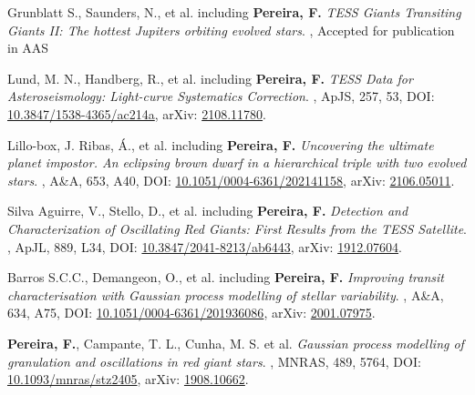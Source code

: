 \documentclass[letterpaper,10pt,oneside]{article}
\begin{document}
\begin{body}
\BulletItem
Grunblatt S., Saunders, N., et al. including \textbf{Pereira, F.} \newline
\textit{TESS Giants Transiting Giants II: The hottest Jupiters orbiting evolved stars}. , Accepted for publication in AAS

\BulletItem
Lund, M. N., Handberg, R., et al. including \textbf{Pereira, F.} \newline
\textit{TESS Data for Asteroseismology: Light-curve Systematics Correction}. , ApJS, 257, 53,
DOI: \href{https://doi.org/10.3847/1538-4365/ac214a}{10.3847/1538-4365/ac214a}, 
arXiv: \href{https://arxiv.org/abs/2108.11780}{2108.11780}.

\BulletItem
Lillo-box, J. Ribas, Á., et al. including \textbf{Pereira, F.} \newline
\textit{Uncovering the ultimate planet impostor. An eclipsing brown dwarf in a hierarchical triple with two evolved stars}. , A\&A, 653, A40,
DOI: \href{https://doi.org/10.1051/0004-6361/202141158}{10.1051/0004-6361/202141158}, 
arXiv: \href{https://arxiv.org/abs/2106.05011}{2106.05011}.

\BulletItem
Silva Aguirre, V., Stello, D., et al. including \textbf{Pereira, F.} \newline
\textit{Detection and Characterization of Oscillating Red Giants: First Results from the TESS Satellite}. , ApJL, 889, L34,
DOI: \href{https://doi.org/10.3847/2041-8213/ab6443}{10.3847/2041-8213/ab6443}, 
arXiv: \href{https://arxiv.org/abs/1912.07604}{1912.07604}.

\BulletItem
Barros S.C.C., Demangeon, O., et al. including \textbf{Pereira, F.} \newline
\textit{Improving transit characterisation with Gaussian process modelling of stellar variability}. , A\&A, 634, A75,
DOI: \href{https://doi.org/10.1051/0004-6361/201936086}{10.1051/0004-6361/201936086}, 
arXiv: \href{https://arxiv.org/abs/2001.07975}{2001.07975}.

\BulletItem
\textbf{Pereira, F.}, Campante, T. L., Cunha, M. S. et al. \newline
\textit{Gaussian process modelling of granulation and oscillations in red giant stars}. , MNRAS, 489, 5764,
DOI: \href{https://doi.org/10.1093/mnras/stz2405}{10.1093/mnras/stz2405}, 
arXiv: \href{https://arxiv.org/abs/1908.10662}{1908.10662}.


\end{body}
\end{document}
